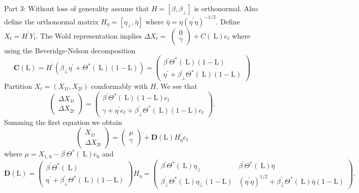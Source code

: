 \documentclass[10pt]{article}
\begin{document}
Part 3: Without loss of generality assume that $H=\left[\beta, \beta_{\perp}\right]$ is orthonormal. Also define the orthonormal matrix $H_{\eta}=\left[\eta_{\perp}, \bar{\eta}\right]$ where $\bar{\eta}=\eta\left(\eta^{\prime} \eta\right)^{-1 / 2}$. Define $X_{t}=H^{\prime} Y_{t}$. The Wold representation implies $\Delta X_{t}=$ $\left(\begin{array}{l}0 \\ \gamma\end{array}\right)+C(\mathrm{~L}) e_{t}$ where using the Beveridge-Nelson decomposition
$$
\boldsymbol{C}(\mathrm{L})=H^{\prime}\left(\beta_{\perp} \eta^{\prime}+\Theta^{*}(\mathrm{~L})(1-\mathrm{L})\right)=\left(\begin{array}{c}
\beta^{\prime} \Theta^{*}(\mathrm{~L})(1-\mathrm{L}) \\
\eta^{\prime}+\beta_{\perp}^{\prime} \Theta^{*}(\mathrm{~L})(1-\mathrm{L})
\end{array}\right)
$$
Partition $X_{t}=\left(X_{1 t}, X_{2 t}\right)$ comformably with $H$. We see that
$$
\left(\begin{array}{c}
\Delta X_{1 t} \\
\Delta X_{2 t}
\end{array}\right)=\left(\begin{array}{c}
\beta^{\prime} \Theta^{*}(\mathrm{~L})(1-\mathrm{L}) e_{t} \\
\gamma+\eta^{\prime} e_{t}+\beta_{\perp}^{\prime} \Theta^{*}(\mathrm{~L})(1-\mathrm{L}) e_{t}
\end{array}\right) .
$$
Summing the first equation we obtain
$$
\left(\begin{array}{c}
X_{1 t} \\
\Delta X_{2 t}
\end{array}\right)=\left(\begin{array}{c}
\mu \\
\gamma
\end{array}\right)+\boldsymbol{D}(\mathrm{L}) H_{\eta}^{\prime} e_{t}
$$
where $\mu=X_{1,0}-\beta^{\prime} \Theta^{*}(\mathrm{~L}) e_{0}$ and
$$
\boldsymbol{D}(\mathrm{L})=\left(\begin{array}{c}
\beta^{\prime} \Theta^{*}(\mathrm{~L}) \\
\eta^{\prime}+\beta_{\perp}^{\prime} \Theta^{*}(\mathrm{~L})(1-\mathrm{L})
\end{array}\right) H_{\eta}=\left(\begin{array}{cc}
\beta^{\prime} \Theta^{*}(\mathrm{~L}) \eta_{\perp} & \beta^{\prime} \Theta^{*}(\mathrm{~L}) \bar{\eta} \\
\beta_{\perp}^{\prime} \Theta^{*}(\mathrm{~L}) \eta_{\perp}(1-\mathrm{L}) & \left(\eta^{\prime} \eta\right)^{1 / 2}+\beta_{\perp}^{\prime} \Theta^{*}(\mathrm{~L}) \bar{\eta}(1-\mathrm{L})
\end{array}\right) .
$$
\end{document}
